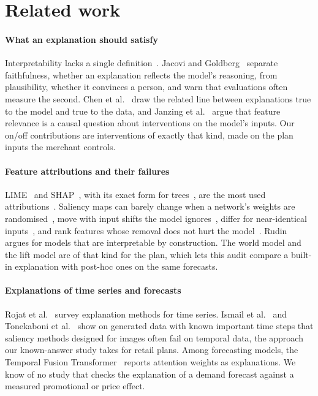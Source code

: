 \section{Related work}
\label{sec:related}

\paragraph{What an explanation should satisfy}
Interpretability lacks a single definition~\cite{lipton2018,doshivelez2017}.
Jacovi and Goldberg~\cite{jacovi2020} separate faithfulness, whether an
explanation reflects the model's reasoning, from plausibility, whether it
convinces a person, and warn that evaluations often measure the second. Chen et
al.~\cite{chen2020} draw the related line between explanations true to the
model and true to the data, and Janzing et al.~\cite{janzing2020} argue that
feature relevance is a causal question about interventions on the model's
inputs. Our on/off contributions are interventions of exactly that kind, made
on the plan inputs the merchant controls.

\paragraph{Feature attributions and their failures}
LIME~\cite{ribeiro2016} and SHAP~\cite{lundberg2017}, with its exact form for
trees~\cite{lundberg2020}, are the most used attributions~\cite{adadi2018}.
Saliency maps can barely change when a network's weights are
randomised~\cite{adebayo2018}, move with input shifts the model
ignores~\cite{kindermans2019}, differ for near-identical
inputs~\cite{alvarezmelis2018}, and rank features whose removal does not hurt
the model~\cite{hooker2019}. Rudin~\cite{rudin2019} argues for models that are
interpretable by construction. The world model and the lift model are of that
kind for the plan, which lets this audit compare a built-in explanation with
post-hoc ones on the same forecasts.

\paragraph{Explanations of time series and forecasts}
Rojat et al.~\cite{rojat2021} survey explanation methods for time series.
Ismail et al.~\cite{ismail2020} and Tonekaboni et
al.~\cite{tonekaboni2020} show on generated data with known important time steps
that saliency methods designed for images often fail on temporal data, the
approach our known-answer study takes for retail plans. Among forecasting
models, the Temporal Fusion Transformer~\cite{tft} reports attention weights
as explanations. We know of no study that checks the explanation of a demand
forecast against a measured promotional or price effect.

